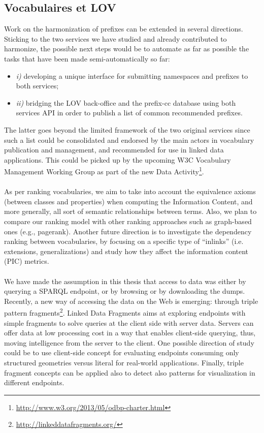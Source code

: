 \documentclass[a4paper,11pt,twoside]{report}
\begin{document}
\subsection*{Vocabulaires et LOV}
\label{sec:nextSteps}
Work on the harmonization of prefixes can be extended in several directions. Sticking to the two services we have studied and already contributed to harmonize, the possible next steps would be to automate as far as possible the tasks that have been made semi-automatically so far:
\begin{itemize}
\item \emph{i)} developing a unique interface for submitting namespaces and prefixes to both services;
\item \emph{ii)} bridging the LOV back-office and the prefix-cc database using both services API in order to publish a list of common recommended prefixes. 
\end{itemize}  The latter goes beyond the limited framework of the two original services since such a list could be consolidated and endorsed by the main actors in vocabulary publication and management, and recommended for use in linked data applications. This could be picked up by the upcoming W3C Vocabulary Management Working Group as part of the new Data Activity\footnote{\url{http://www.w3.org/2013/05/odbp-charter.html}}.

\paragraph{}
 As per ranking vocabularies, we aim to take into account the equivalence axioms (between classes and properties) when computing the Information Content, and more generally, all sort of semantic relationships between terms. Also, we plan to compare our ranking model with other ranking approaches such as graph-based ones (e.g., pagerank). Another future direction is to investigate the dependency ranking between vocabularies, by focusing on a specific type of ``inlinks'' (i.e. extensions, generalizations) and study how they affect the information content (PIC) metrics.


\paragraph{}
We have made the assumption in this thesis that access to data was either by  querying a SPARQL endpoint, or by browsing or by downloading the dumps. Recently, a new way of accessing the data on the Web is emerging: through triple pattern fragments\footnote{\url{http://linkeddatafragments.org/}}. Linked Data Fragments \cite{verborgh2014ldf} aims at exploring endpoints with simple fragments to solve queries at the client side with server data.
Servers can offer data at low processing cost in a way that enables client-side querying, thus, moving intelligence from the server to the client. One possible direction of study could be to use client-side concept for evaluating endpoints consuming only structured geometries versus literal for real-world applications. Finally, triple fragment concepts can be applied also to detect also patterns for visualization in different endpoints.
 
\end{document}
